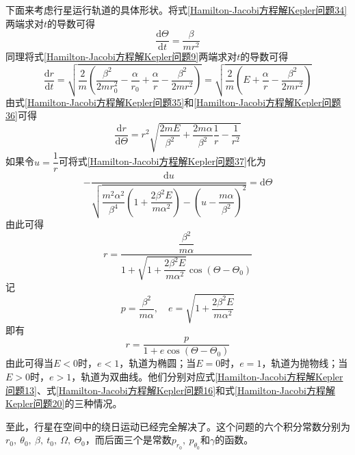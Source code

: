 下面来考虑行星运行轨道的具体形状。将式\eqref{Hamilton-Jacobi方程解Kepler问题34}两端求对$t$的导数可得
\begin{equation}
	\frac{\mathrm{d}\varTheta}{\mathrm{d}t} = \frac{\beta}{mr^2}
	\label{Hamilton-Jacobi方程解Kepler问题35}
\end{equation}
同理将式\eqref{Hamilton-Jacobi方程解Kepler问题9}两端求对$t$的导数可得
\begin{equation}
	\frac{\mathrm{d}r}{\mathrm{d}t} = \sqrt{\frac{2}{m}\left(\frac{\beta^2}{2mr_0^2}-\frac{\alpha}{r_0}+ \frac{\alpha}{r}- \frac{\beta^2}{2mr^2}\right)} = \sqrt{\frac{2}{m}\left(E+\frac{\alpha}{r}-\frac{\beta^2}{2mr^2}\right)}
	\label{Hamilton-Jacobi方程解Kepler问题36}
\end{equation}
由式\eqref{Hamilton-Jacobi方程解Kepler问题35}和\eqref{Hamilton-Jacobi方程解Kepler问题36}可得
\begin{equation}
	\frac{\mathrm{d}r}{\mathrm{d}\varTheta} = r^2\sqrt{\frac{2mE}{\beta^2}+ \frac{2m\alpha}{\beta^2} \frac1r - \frac{1}{r^2}}
	\label{Hamilton-Jacobi方程解Kepler问题37}
\end{equation}
如果令$u = \dfrac1r$可将式\eqref{Hamilton-Jacobi方程解Kepler问题37}化为
\begin{equation*}
	-\frac{\mathrm{d}u}{\sqrt{\dfrac{m^2\alpha^2}{\beta^4}\left(1+\dfrac{2\beta^2E}{m\alpha^2}\right) - \left(u - \dfrac{m\alpha}{\beta^2}\right)^2}} = \mathrm{d}\varTheta
\end{equation*}
由此可得
\begin{equation*}
	r = \frac{\dfrac{\beta^2}{m\alpha}}{1+\sqrt{1+\dfrac{2\beta^2E}{m\alpha^2}}\cos(\varTheta-\varTheta_0)}
\end{equation*}
记
\begin{equation}
	p = \dfrac{\beta^2}{m\alpha},\quad e = \sqrt{1+\dfrac{2\beta^2E}{m\alpha^2}}
	\label{Hamilton-Jacobi方程解Kepler问题38}
\end{equation}
即有
\begin{equation}
	r = \frac{p}{1+e\cos(\varTheta-\varTheta_0)}
	\label{Hamilton-Jacobi方程解Kepler问题39}
\end{equation}
由此可得当$E<0$时，$e<1$，轨道为椭圆；当$E=0$时，$e=1$，轨道为抛物线；当$E>0$时，$e>1$，轨道为双曲线。他们分别对应式\eqref{Hamilton-Jacobi方程解Kepler问题13}、式\eqref{Hamilton-Jacobi方程解Kepler问题16}和式\eqref{Hamilton-Jacobi方程解Kepler问题20}的三种情况。

至此，行星在空间中的绕日运动已经完全解决了。这个问题的六个积分常数分别为$r_0,~\theta_0,~\beta,~t_0,~\varOmega,~\varTheta_0$，而后面三个是常数$p_{r_0},~p_{\theta_0}$和$\gamma$的函数。

